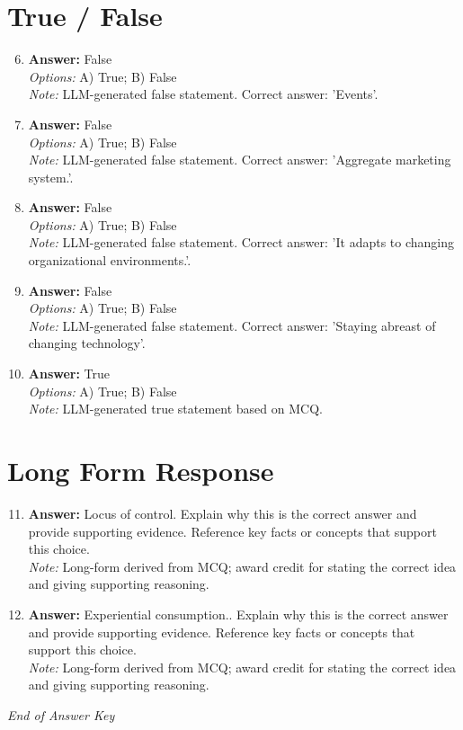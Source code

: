 \documentclass[12pt]{article}
\begin{document}
\section*{True / False}
\begin{enumerate}[label=\arabic*.]
\setcounter{enumi}{5}
\item \textbf{Answer:} False
\\ \textit{Options:} A) True; B) False
\\ \textit{Note:} LLM-generated false statement. Correct answer: 'Events'.
\item \textbf{Answer:} False
\\ \textit{Options:} A) True; B) False
\\ \textit{Note:} LLM-generated false statement. Correct answer: 'Aggregate marketing system.'.
\item \textbf{Answer:} False
\\ \textit{Options:} A) True; B) False
\\ \textit{Note:} LLM-generated false statement. Correct answer: 'It adapts to changing organizational environments.'.
\item \textbf{Answer:} False
\\ \textit{Options:} A) True; B) False
\\ \textit{Note:} LLM-generated false statement. Correct answer: 'Staying abreast of changing technology'.
\item \textbf{Answer:} True
\\ \textit{Options:} A) True; B) False
\\ \textit{Note:} LLM-generated true statement based on MCQ.
\end{enumerate}

\section*{Long Form Response}
\begin{enumerate}[label=\arabic*.]
\setcounter{enumi}{10}
\item \textbf{Answer:} Locus of control. Explain why this is the correct answer and provide supporting evidence. Reference key facts or concepts that support this choice.
\\ \textit{Note:} Long-form derived from MCQ; award credit for stating the correct idea and giving supporting reasoning.
\item \textbf{Answer:} Experiential consumption.. Explain why this is the correct answer and provide supporting evidence. Reference key facts or concepts that support this choice.
\\ \textit{Note:} Long-form derived from MCQ; award credit for stating the correct idea and giving supporting reasoning.
\end{enumerate}

\vfill
\noindent\textit{End of Answer Key}
\end{document}
